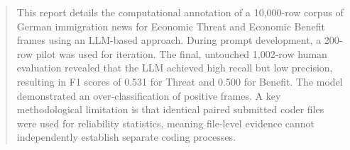 \documentclass[11pt,a4paper]{article}
\begin{document}
\begin{abstract}
This report details the computational annotation of a 10,000-row corpus of German immigration news for Economic Threat and Economic Benefit frames using an LLM-based approach. During prompt development, a 200-row pilot was used for iteration. The final, untouched 1,002-row human evaluation revealed that the LLM achieved high recall but low precision, resulting in F1 scores of 0.531 for Threat and 0.500 for Benefit. The model demonstrated an over-classification of positive frames. A key methodological limitation is that identical paired submitted coder files were used for reliability statistics, meaning file-level evidence cannot independently establish separate coding processes.
\end{abstract}

\tableofcontents
\newpage
\listoftables
\newpage
\listoffigures
\newpage











\newpage
{}
\end{document}
